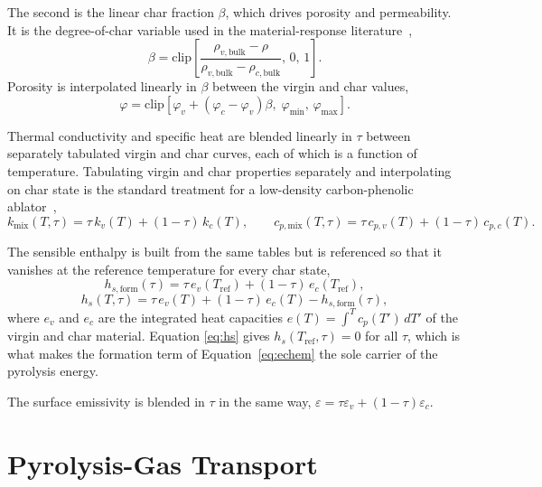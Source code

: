 \documentclass[11pt]{report}
\begin{document}
The second is the linear char fraction $\beta$, which drives porosity and
permeability. It is the degree-of-char variable used in the material-response
literature~\cite{amar2016char},
\begin{equation}
\beta = \mathrm{clip}\!\left[
\frac{\rho_{v,\mathrm{bulk}} - \rho}{\rho_{v,\mathrm{bulk}} - \rho_{c,\mathrm{bulk}}},\, 0,\, 1\right].
\label{eq:beta}
\end{equation}
Porosity is interpolated linearly in $\beta$ between the virgin and char values,
\begin{equation}
\varphi = \mathrm{clip}\left[\varphi_v + (\varphi_c - \varphi_v)\beta,\;
\varphi_{\min},\, \varphi_{\max}\right].
\end{equation}

Thermal conductivity and specific heat are blended linearly in $\tau$ between
separately tabulated virgin and char curves, each of which is a function of
temperature. Tabulating virgin and char properties separately and interpolating
on char state is the standard treatment for a low-density carbon-phenolic
ablator~\cite{milos2010pica},
\begin{equation}
k_{\mathrm{mix}}(T,\tau) = \tau\, k_v(T) + (1-\tau)\, k_c(T),
\qquad
c_{p,\mathrm{mix}}(T,\tau) = \tau\, c_{p,v}(T) + (1-\tau)\, c_{p,c}(T).
\label{eq:mixing}
\end{equation}

The sensible enthalpy is built from the same tables but is referenced so that it
vanishes at the reference temperature for every char state,
\begin{equation}
h_{s,\mathrm{form}}(\tau) = \tau\, e_v(T_{\mathrm{ref}}) + (1-\tau)\, e_c(T_{\mathrm{ref}}),
\end{equation}
\begin{equation}
h_{s}(T,\tau) = \tau\, e_v(T) + (1-\tau)\, e_c(T) - h_{s,\mathrm{form}}(\tau),
\label{eq:hs}
\end{equation}
where $e_v$ and $e_c$ are the integrated heat capacities
$e(T) = \int^{T} c_p(T')\,dT'$ of the virgin and char material. Equation
\eqref{eq:hs} gives $h_s(T_{\mathrm{ref}}, \tau) = 0$ for all $\tau$, which is
what makes the formation term of Equation~\eqref{eq:echem} the sole carrier of
the pyrolysis energy.

The surface emissivity is blended in $\tau$ in the same way,
$\varepsilon = \tau \varepsilon_v + (1-\tau)\varepsilon_c$.

\section{Pyrolysis-Gas Transport}
\label{sec:gas}
\end{document}
